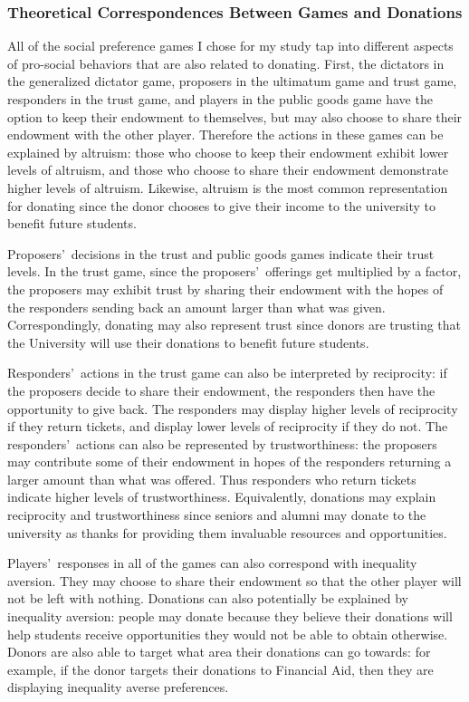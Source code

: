 \documentclass[12pt]{article}
\begin{document}
\subsubsection{Theoretical Correspondences Between Games and Donations}

All of the social preference games I chose for my study tap into different aspects of pro-social behaviors that are also related to donating. First, the dictators in the generalized dictator game, proposers in the ultimatum game and trust game, responders in the trust game, and players in the public goods game have the option to keep their endowment to themselves, but may also choose to share their endowment with the other player. Therefore the actions in these games can be explained by altruism: those who choose to keep their endowment exhibit lower levels of altruism, and those who choose to share their endowment demonstrate higher levels of altruism. Likewise, altruism is the most common representation for donating since the donor chooses to give their income to the university to benefit future students. 

Proposers\rq \ decisions in the trust and public goods games indicate their trust levels. In the trust game, since the proposers\rq \ offerings get multiplied by a factor, the proposers may exhibit trust by sharing their endowment with the hopes of the responders sending back an amount larger than what was given. Correspondingly, donating may also represent trust since donors are trusting that the University will use their donations to benefit future students.

Responders\rq \ actions in the trust game can also be interpreted by reciprocity: if the proposers decide to share their endowment, the responders then have the opportunity to give back. The responders may display higher levels of reciprocity if they return tickets, and display lower levels of reciprocity if they do not. The responders\rq \ actions can also be represented by trustworthiness: the proposers may contribute some of their endowment in hopes of the responders returning a larger amount than what was offered. Thus responders who return tickets indicate higher levels of trustworthiness. Equivalently, donations may explain reciprocity and trustworthiness since seniors and alumni may donate to the university as thanks for providing them invaluable resources and opportunities.

Players\rq \ responses in all of the games can also correspond with inequality aversion. They may choose to share their endowment so that the other player will not be left with nothing. Donations can also potentially be explained by inequality aversion: people may donate because they believe their donations will help students receive opportunities they would not be able to obtain otherwise. Donors are also able to target what area their donations can go towards: for example, if the donor targets their donations to Financial Aid, then they are displaying inequality averse preferences.
\end{document}
